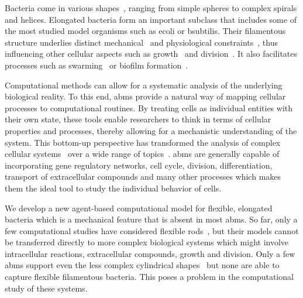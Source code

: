 Bacteria come in various shapes~\cite{Young2006,Young2007}, ranging from simple spheres to complex
spirals and helices.
Elongated bacteria form an important subclass that includes some of the most studied model
organisms such as \ac{ecoli} or \ac{bsubtilis}.
Their filamentous structure underlies distinct mechanical~\cite{Daniel2003} and physiological
constraints~\cite{Jones2001}, thus influencing other cellular aspects such as
growth~\cite{Chang2014} and division~\cite{Li2007}.
It also facilitates processes such as swarming~\cite{Harshey1994} or biofilm
formation~\cite{Duvernoy2018}.

Computational methods can allow for a systematic analysis of the underlying biological reality.
To this end, \acp{abm} provide a natural way of mapping cellular processes to computational
routines.
By treating cells as individual entities with their own state, these tools enable researchers to
think in terms of cellular properties and processes, thereby allowing for a mechanistic
understanding of the system.
This bottom-up perspective has transformed the analysis of complex cellular
systems~\cite{Pleyer2023} over a wide range of
topics~\cite{Ghaffarizadeh2018,Cooper2020,Karolak2021,DeRybel2014}.
\acp{abm} are generally capable of incorporating gene regulatory networks, cell cycle, division,
differentiation, transport of extracellular compounds and many other processes which makes them the
ideal tool to study the individual behavior of cells.

We develop a new agent-based computational model for flexible, elongated bacteria which
is a mechanical feature that is absent in most \acp{abm}.
So far, only a few computational studies have considered flexible rods~\cite{Duman2018,Joshi2019},
but their models cannot be transferred directly to more complex biological systems which might
involve intracellular reactions, extracellular compounds, growth and division.
Only a few \acp{abm} support even the less complex cylindrical
shapes~\cite{Kang2014,Breitwieser2021,Gorochowski2012} but none are able to capture
flexible filamentous bacteria.
This poses a problem in the computational study of these systems.

